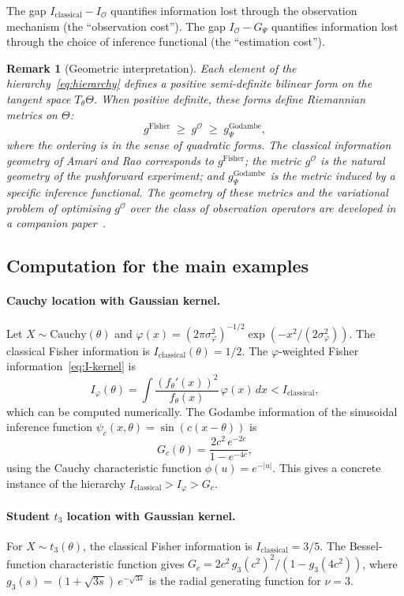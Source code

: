 \documentclass[11pt,a4paper]{article}
\newtheorem{remark}[theorem]{Remark}
\begin{document}
The gap $I_{\mathrm{classical}} - I_{\mathcal O}$ quantifies information
lost through the observation mechanism (the ``observation cost'').  The gap
$I_{\mathcal O} - G_\Psi$ quantifies information lost through the choice
of inference functional (the ``estimation cost'').

\begin{remark}[Geometric interpretation]\label{rem:hierarchy-geometry}
Each element of the hierarchy~\eqref{eq:hierarchy} defines a positive
semi-definite bilinear form on the tangent space $T_\theta\Theta$.  When
positive definite, these forms define Riemannian metrics on $\Theta$:
\[
g^{\mathrm{Fisher}} \;\geq\; g^{\mathcal O} \;\geq\; g^{\mathrm{Godambe}}_\Psi,
\]
where the ordering is in the sense of quadratic forms.  The classical
information geometry of Amari and Rao corresponds to
$g^{\mathrm{Fisher}}$; the metric $g^{\mathcal O}$ is the natural geometry
of the pushforward experiment; and $g^{\mathrm{Godambe}}_\Psi$ is the
metric induced by a specific inference functional.  The geometry of these
metrics and the variational problem of optimising $g^{\mathcal O}$ over the
class of observation operators are developed in a companion
paper~\cite{LabouriauE}.
\end{remark}

\subsection{Computation for the main examples}\label{subsec:hierarchy-examples}

\paragraph{Cauchy location with Gaussian kernel.}
Let $X \sim \mathrm{Cauchy}(\theta)$ and
$\varphi(x) = (2\pi\sigma_\varphi^2)^{-1/2}\exp(-x^2/(2\sigma_\varphi^2))$.
The classical Fisher information is
$I_{\mathrm{classical}}(\theta) = 1/2$.  The $\varphi$-weighted Fisher
information~\eqref{eq:I-kernel} is
\[
I_\varphi(\theta)
= \int \frac{(f_\theta'(x))^2}{f_\theta(x)}\,\varphi(x)\,dx
< I_{\mathrm{classical}},
\]
which can be computed numerically.  The Godambe information of the
sinusoidal inference function $\psi_c(x, \theta) = \sin(c(x-\theta))$ is
\[
G_c(\theta)
= \frac{2c^2\,e^{-2c}}{1 - e^{-4c}},
\]
using the Cauchy characteristic function $\phi(u) = e^{-|u|}$.
This gives a concrete instance of the hierarchy
$I_{\mathrm{classical}} > I_\varphi > G_c$.

\paragraph{Student $t_3$ location with Gaussian kernel.}
For $X \sim t_3(\theta)$, the classical Fisher information is
$I_{\mathrm{classical}} = 3/5$.
The Bessel-function characteristic function gives
$G_c = 2c^2\,g_3(c^2)^2 / (1 - g_3(4c^2))$,
where $g_3(s) = (1 + \sqrt{3s})\,e^{-\sqrt{3s}}$ is the radial generating
function for $\nu = 3$.
\end{document}
